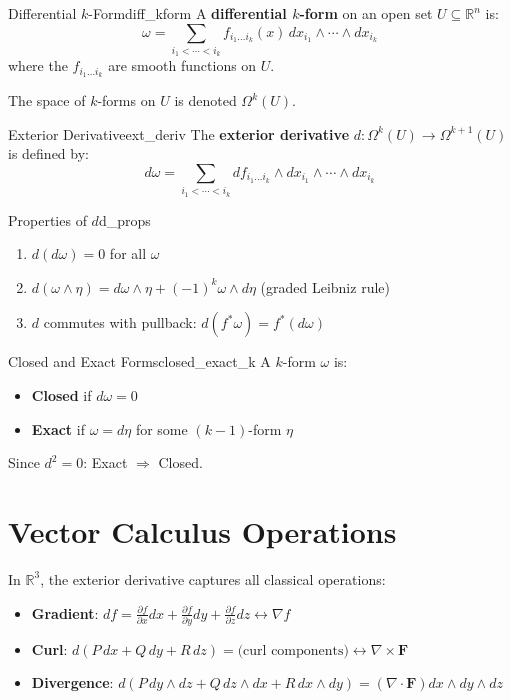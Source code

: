 \documentclass[11pt, letterpaper, openany]{book}
\begin{document}
\begin{defn}{Differential $k$-Form}{diff_kform}
A \textbf{differential $k$-form} on an open set $U \subseteq \mathbb{R}^n$ is:
\[
\omega = \sum_{i_1 < \cdots < i_k} f_{i_1 \ldots i_k}(x) \, dx_{i_1} \wedge \cdots \wedge dx_{i_k}
\]
where the $f_{i_1 \ldots i_k}$ are smooth functions on $U$.
\end{defn}

The space of $k$-forms on $U$ is denoted $\Omega^k(U)$.

\begin{defn}{Exterior Derivative}{ext_deriv}
The \textbf{exterior derivative} $d: \Omega^k(U) \to \Omega^{k+1}(U)$ is defined by:
\[
d\omega = \sum_{i_1 < \cdots < i_k} df_{i_1 \ldots i_k} \wedge dx_{i_1} \wedge \cdots \wedge dx_{i_k}
\]
\end{defn}

\begin{thm}{Properties of $d$}{d_props}
\begin{enumerate}
    \item $d(d\omega) = 0$ for all $\omega$
    \item $d(\omega \wedge \eta) = d\omega \wedge \eta + (-1)^k \omega \wedge d\eta$ (graded Leibniz rule)
    \item $d$ commutes with pullback: $d(f^*\omega) = f^*(d\omega)$
\end{enumerate}
\end{thm}

\begin{defn}{Closed and Exact Forms}{closed_exact_k}
A $k$-form $\omega$ is:
\begin{itemize}
    \item \textbf{Closed} if $d\omega = 0$
    \item \textbf{Exact} if $\omega = d\eta$ for some $(k-1)$-form $\eta$
\end{itemize}
Since $d^2 = 0$: Exact $\Rightarrow$ Closed.
\end{defn}

\section{Vector Calculus Operations}

In $\mathbb{R}^3$, the exterior derivative captures all classical operations:

\begin{itemize}
    \item \textbf{Gradient}: $df = \frac{\partial f}{\partial x}dx + \frac{\partial f}{\partial y}dy + \frac{\partial f}{\partial z}dz \leftrightarrow \nabla f$
    \item \textbf{Curl}: $d(P\,dx + Q\,dy + R\,dz) = \text{(curl components)} \leftrightarrow \nabla \times \mathbf{F}$
    \item \textbf{Divergence}: $d(P\,dy \wedge dz + Q\,dz \wedge dx + R\,dx \wedge dy) = (\nabla \cdot \mathbf{F}) dx \wedge dy \wedge dz$
\end{itemize}
\end{document}
